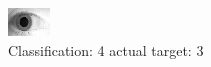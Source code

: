 \begin{figure}[h!]
\begin{center}
\includegraphics[width=0.60\columnwidth]{figures/ID1948_class_4_target_3.png}
\end{center}
\caption{ Classification: 4 actual target: 3}
\label{fig:ID1948_class_4_target_3}
\end{figure}
